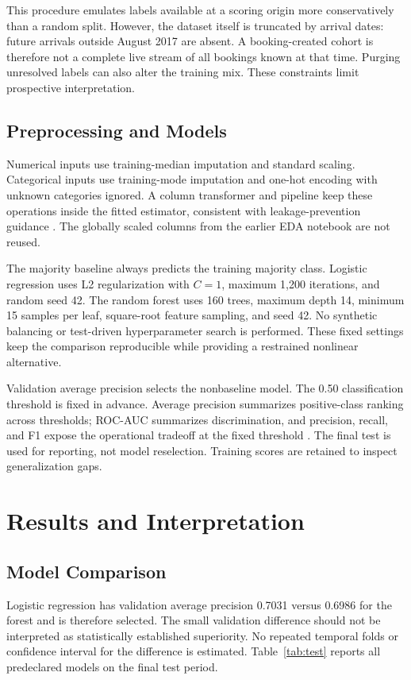 \documentclass[conference]{IEEEtran}
\begin{document}
This procedure emulates labels available at a scoring origin more conservatively than a random split. However, the dataset itself is truncated by arrival dates: future arrivals outside August 2017 are absent. A booking-created cohort is therefore not a complete live stream of all bookings known at that time. Purging unresolved labels can also alter the training mix. These constraints limit prospective interpretation.

\subsection{Preprocessing and Models}
Numerical inputs use training-median imputation and standard scaling. Categorical inputs use training-mode imputation and one-hot encoding with unknown categories ignored. A column transformer and pipeline keep these operations inside the fitted estimator, consistent with leakage-prevention guidance \cite{pitfalls}. The globally scaled columns from the earlier EDA notebook are not reused.

The majority baseline always predicts the training majority class. Logistic regression uses L2 regularization with $C=1$, maximum 1,200 iterations, and random seed 42. The random forest uses 160 trees, maximum depth 14, minimum 15 samples per leaf, square-root feature sampling, and seed 42. No synthetic balancing or test-driven hyperparameter search is performed. These fixed settings keep the comparison reproducible while providing a restrained nonlinear alternative.

Validation average precision selects the nonbaseline model. The 0.50 classification threshold is fixed in advance. Average precision summarizes positive-class ranking across thresholds; ROC-AUC summarizes discrimination, and precision, recall, and F1 expose the operational tradeoff at the fixed threshold \cite{saito,metrics}. The final test is used for reporting, not model reselection. Training scores are retained to inspect generalization gaps.

\section{Results and Interpretation}
\subsection{Model Comparison}
Logistic regression has validation average precision 0.7031 versus 0.6986 for the forest and is therefore selected. The small validation difference should not be interpreted as statistically established superiority. No repeated temporal folds or confidence interval for the difference is estimated. Table~\ref{tab:test} reports all predeclared models on the final test period.
\end{document}
